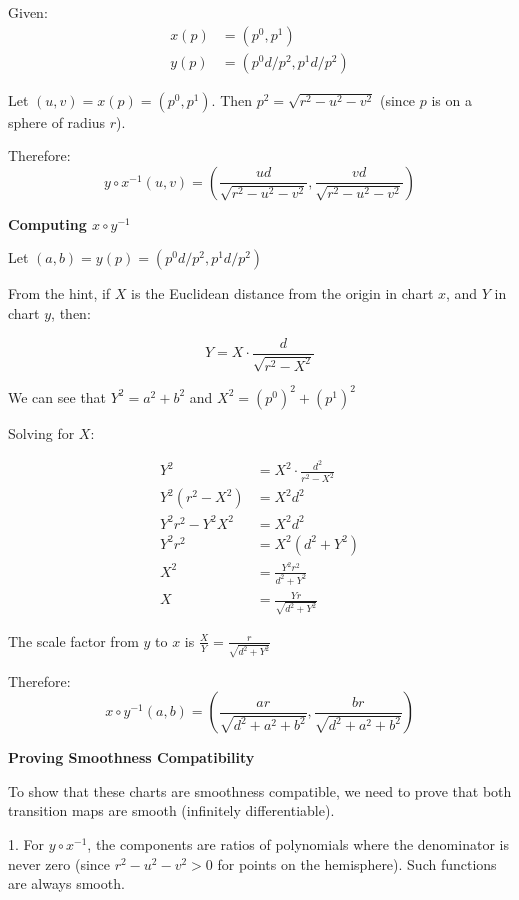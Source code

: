 \documentclass{article}
\begin{document}
Given:
\begin{align*}
x(p) &= (p^0, p^1) \\
y(p) &= (p^0d/p^2, p^1d/p^2)
\end{align*}

Let $(u, v) = x(p) = (p^0, p^1)$. Then $p^2 = \sqrt{r^2 - u^2 - v^2}$ (since $p$ is on a sphere of radius $r$).

Therefore:
\begin{equation*}
y \circ x^{-1}(u, v) = \left(\frac{ud}{\sqrt{r^2 - u^2 - v^2}}, \frac{vd}{\sqrt{r^2 - u^2 - v^2}}\right)
\end{equation*}

\textbf{Computing $x \circ y^{-1}$}

Let $(a, b) = y(p) = (p^0d/p^2, p^1d/p^2)$

From the hint, if $X$ is the Euclidean distance from the origin in chart $x$, and $Y$ in chart $y$, then:

\begin{equation*}
Y = X \cdot \frac{d}{\sqrt{r^2 - X^2}}
\end{equation*}

We can see that $Y^2 = a^2 + b^2$ and $X^2 = (p^0)^2 + (p^1)^2$

Solving for $X$:

\begin{align*}
Y^2 &= X^2 \cdot \frac{d^2}{r^2 - X^2} \\
Y^2(r^2 - X^2) &= X^2d^2 \\
Y^2r^2 - Y^2X^2 &= X^2d^2 \\
Y^2r^2 &= X^2(d^2 + Y^2) \\
X^2 &= \frac{Y^2r^2}{d^2 + Y^2} \\
X &= \frac{Yr}{\sqrt{d^2 + Y^2}}
\end{align*}

The scale factor from $y$ to $x$ is $\frac{X}{Y} = \frac{r}{\sqrt{d^2 + Y^2}}$

Therefore:
\begin{equation*}
x \circ y^{-1}(a, b) = \left(\frac{ar}{\sqrt{d^2 + a^2 + b^2}}, \frac{br}{\sqrt{d^2 + a^2 + b^2}}\right)
\end{equation*}

\textbf{Proving Smoothness Compatibility}

To show that these charts are smoothness compatible, we need to prove that both transition maps are smooth (infinitely differentiable).

1. For $y \circ x^{-1}$, the components are ratios of polynomials where the denominator is never zero (since $r^2 - u^2 - v^2 > 0$ for points on the hemisphere). Such functions are always smooth.
\end{document}
